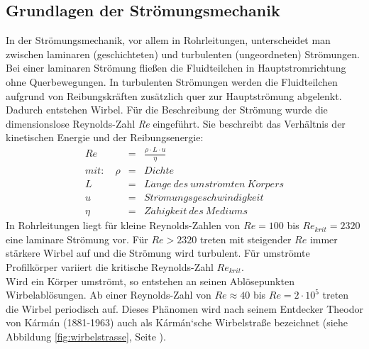 \subsection{Grundlagen der Strömungsmechanik}
In der Strömungsmechanik, vor allem in Rohrleitungen, unterscheidet man zwischen laminaren (geschichteten) und turbulenten (ungeordneten) Strömungen. Bei einer laminaren Strömung fließen die Fluidteilchen in Hauptstromrichtung ohne Querbewegungen. In turbulenten Strömungen werden die Fluidteilchen aufgrund von Reibungskräften zusätzlich quer zur Hauptströmung abgelenkt. Dadurch entstehen Wirbel. Für die Beschreibung der Strömung wurde die dimensionslose Reynolds-Zahl \textit{Re} eingeführt. Sie beschreibt das Verhältnis der kinetischen Energie und der Reibungsenergie:
\begin{eqnarray} \label{for:Re}
    Re &=&\frac{\rho \cdot L \cdot u}{\eta}\\
    mit: \quad \rho &=& Dichte \nonumber \\
    L &=& L\ddot{a}nge~ des ~umstr\ddot{o}mten ~ K\ddot{o}rpers \nonumber \\
    u &=& Str\ddot{o}mungsgeschwindigkeit \nonumber \\
    \eta &=& Z\ddot{a}higkeit ~ des ~ Mediums  \nonumber
\end{eqnarray}
In Rohrleitungen liegt für kleine Reynolds-Zahlen von $Re = 100$ bis $Re_{krit} = 2320$ eine laminare Strömung vor. Für $Re > 2320 $ treten mit steigender $Re$ immer stärkere Wirbel auf und die Strömung wird turbulent. Für umströmte Profilkörper variiert die kritische Reynolds-Zahl $Re_{krit}$. \autocites[vgl.][63]{Physik}[vgl.][342]{Böge} \\
Wird ein Körper umströmt, so entstehen an seinen Ablösepunkten Wirbelablösungen. Ab einer Reynolds-Zahl von $Re \approx 40$ bis $Re = 2 \cdot 10^5$ treten die Wirbel periodisch auf. Dieses Phänomen wird nach seinem Entdecker Theodor von K\'{a}rm\'{a}n (1881-1963) auch als K\'{a}rm\'{a}n`sche Wirbelstraße bezeichnet (siehe Abbildung \ref{fig:wirbelstrasse}, Seite \pageref{fig:wirbelstrasse}). \autocite[vgl.][441 \psq]{Surek}

